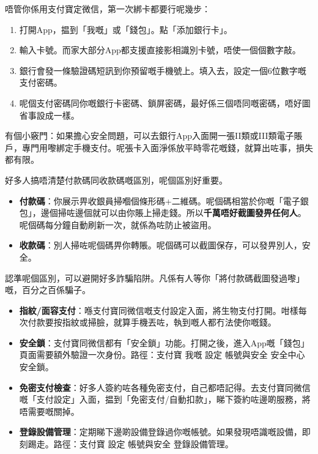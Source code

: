 


唔管你係用支付寶定微信，第一次綁卡都要行呢幾步：

\begin{enumerate}
  \item 打開App，揾到「我嘅」或「錢包」。點「添加銀行卡」。
  \item 輸入卡號。而家大部分App都支援直接影相識別卡號，唔使一個個數字敲。
  \item 銀行會發一條驗證碼短訊到你預留嘅手機號上。填入去，設定一個6位數字嘅支付密碼。
  \item 呢個支付密碼同你嘅銀行卡密碼、鎖屏密碼，最好係三個唔同嘅密碼，唔好圖省事設成一樣。
\end{enumerate}

有個小竅門：如果擔心安全問題，可以去銀行App入面開一張II類或III類電子賬戶，專門用嚟綁定手機支付。呢張卡入面淨係放平時零花嘅錢，就算出咗事，損失都有限。


好多人搞唔清楚付款碼同收款碼嘅區別，呢個區別好重要。

\begin{itemize}
  \item \textbf{付款碼}：你展示畀收銀員掃嗰個條形碼+二維碼。呢個碼相當於你嘅「電子銀包」，邊個掃咗邊個就可以由你賬上掃走錢。所以\textbf{千萬唔好截圖發畀任何人}。呢個碼每分鐘自動刷新一次，就係為咗防止被盜用。
  \item \textbf{收款碼}：別人掃咗呢個碼畀你轉賬。呢個碼可以截圖保存，可以發畀別人，安全。
\end{itemize}

認準呢個區別，可以避開好多詐騙陷阱。凡係有人等你「將付款碼截圖發過嚟」嘅，百分之百係騙子。


\begin{itemize}
  \item \textbf{指紋/面容支付}：喺支付寶同微信嘅支付設定入面，將生物支付打開。咁樣每次付款要按指紋或掃臉，就算手機丟咗，執到嘅人都冇法使你嘅錢。
  \item \textbf{安全鎖}：支付寶同微信都有「安全鎖」功能。打開之後，進入App嘅「錢包」頁面需要額外驗證一次身份。路徑：支付寶 我嘅 設定 帳號與安全 安全中心 安全鎖。
  \item \textbf{免密支付檢查}：好多人簽約咗各種免密支付，自己都唔記得。去支付寶同微信嘅「支付設定」入面，揾到「免密支付/自動扣款」，睇下簽約咗邊啲服務，將唔需要嘅關掉。
  \item \textbf{登錄設備管理}：定期睇下邊啲設備登錄過你嘅帳號。如果發現唔識嘅設備，即刻踢走。路徑：支付寶 設定 帳號與安全 登錄設備管理。
\end{itemize}

